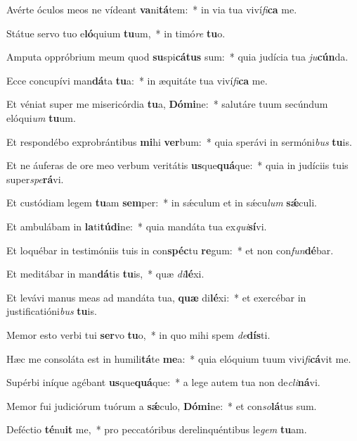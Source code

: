 \item Avérte óculos meos ne vídeant \textbf{va}ni\textbf{tá}tem:~* in via tua viví\textit{fi}\textbf{ca} me.
\item Státue servo tuo e\textbf{ló}quium \textbf{tu}um,~* in timó\textit{re} \textbf{tu}o.
\item Amputa oppróbrium meum quod \textbf{su}spi\textbf{cá}\textbf{tus} sum:~* quia judícia tua \textit{ju}\textbf{cún}da.
\item Ecce concupívi man\textbf{dá}ta \textbf{tu}a:~* in æquitáte tua viví\textit{fi}\textbf{ca} me.
\item Et véniat super me misericórdia \textbf{tu}a, \textbf{Dó}\textbf{mi}ne:~* salutáre tuum secúndum elóqui\textit{um} \textbf{tu}um.
\item Et respondébo exprobrántibus \textbf{mi}hi \textbf{ver}bum:~* quia sperávi in sermóni\textit{bus} \textbf{tu}is.
\item Et ne áuferas de ore meo verbum veritátis \textbf{us}que\textbf{quá}que:~* quia in judíciis tuis super\textit{spe}\textbf{rá}vi.
\item Et custódiam legem \textbf{tu}am \textbf{sem}per:~* in sǽculum et in sǽcu\textit{lum} \textbf{sǽ}culi.
\item Et ambulábam in \textbf{la}ti\textbf{tú}\textbf{di}ne:~* quia mandáta tua ex\textit{qui}\textbf{sí}vi.
\item Et loquébar in testimóniis tuis in con\textbf{spéc}tu \textbf{re}gum:~* et non con\textit{fun}\textbf{dé}bar.
\item Et meditábar in man\textbf{dá}tis \textbf{tu}is,~* quæ \textit{di}\textbf{lé}xi.
\item Et levávi manus meas ad mandáta tua, \textbf{quæ} di\textbf{lé}xi:~* et exercébar in justificatióni\textit{bus} \textbf{tu}is.
\item Memor esto verbi tui \textbf{ser}vo \textbf{tu}o,~* in quo mihi spem \textit{de}\textbf{dís}ti.
\item Hæc me consoláta est in humili\textbf{tá}te \textbf{me}a:~* quia elóquium tuum vivi\textit{fi}\textbf{cá}vit me.
\item Supérbi iníque agébant \textbf{us}que\textbf{quá}que:~* a lege autem tua non de\textit{cli}\textbf{ná}vi.
\item Memor fui judiciórum tuórum a \textbf{sǽ}culo, \textbf{Dó}\textbf{mi}ne:~* et con\textit{so}\textbf{lá}tus sum.
\item Deféctio \textbf{té}nu\textbf{it} me,~* pro peccatóribus derelinquéntibus le\textit{gem} \textbf{tu}am.
